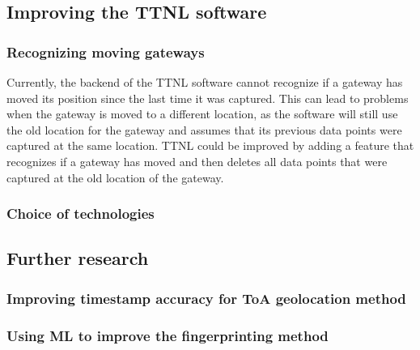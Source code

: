 \subsection{Improving the \acf{TTNL} software}

\subsubsection{Recognizing moving gateways}

Currently, the backend of the \ac{TTNL} software cannot recognize if a gateway has moved its position since the last time it was captured.
This can lead to problems when the gateway is moved to a different location, as the software will still use the old location for the gateway and assumes that its previous data
points were captured at the same location.
\ac{TTNL} could be improved by adding a feature that recognizes if a gateway has moved and then deletes all data points that were captured at the old location of the gateway.

\subsubsection{Choice of technologies}

\subsection{Further research}

\subsubsection{Improving timestamp accuracy for \acf{ToA} geolocation method}


\subsubsection{Using \acf{ML} to improve the fingerprinting method}